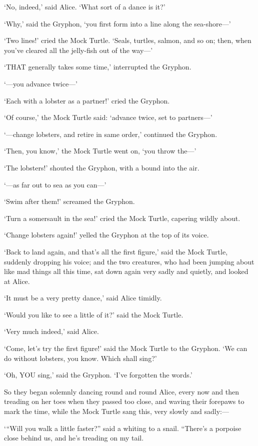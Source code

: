 \documentclass[12pt]{article}
\begin{document}
\begin{Parallel}[p]{}{}
{‘No, indeed,’ said Alice. ‘What sort of a dance is it?’

‘Why,’ said the Gryphon, ‘you first form into a line along the sea-shore—’

‘Two lines!’ cried the Mock Turtle. ‘Seals, turtles, salmon, and so on; then, when you’ve cleared all the jelly-fish out of the way—’

‘THAT generally takes some time,’ interrupted the Gryphon.

‘—you advance twice—’

‘Each with a lobster as a partner!’ cried the Gryphon.

‘Of course,’ the Mock Turtle said: ‘advance twice, set to partners—’

‘—change lobsters, and retire in same order,’ continued the Gryphon.

‘Then, you know,’ the Mock Turtle went on, ‘you throw the—’

‘The lobsters!’ shouted the Gryphon, with a bound into the air.

‘—as far out to sea as you can—’

‘Swim after them!’ screamed the Gryphon.

‘Turn a somersault in the sea!’ cried the Mock Turtle, capering wildly about.

‘Change lobsters again!’ yelled the Gryphon at the top of its voice.

‘Back to land again, and that’s all the first figure,’ said the Mock Turtle, suddenly dropping his voice; and the two creatures, who had been jumping about like mad things all this time, sat down again very sadly and quietly, and looked at Alice.

‘It must be a very pretty dance,’ said Alice timidly.

‘Would you like to see a little of it?’ said the Mock Turtle.

‘Very much indeed,’ said Alice.

‘Come, let’s try the first figure!’ said the Mock Turtle to the Gryphon. ‘We can do without lobsters, you know. Which shall sing?’

‘Oh, YOU sing,’ said the Gryphon. ‘I’ve forgotten the words.’

So they began solemnly dancing round and round Alice, every now and then treading on her toes when they passed too close, and waving their forepaws to mark the time, while the Mock Turtle sang this, very slowly and sadly:—

 ‘“Will you walk a little faster?” said a whiting to a snail.
 “There’s a porpoise close behind us, and he’s treading on my tail.

}
\end{Parallel}
\end{document}
